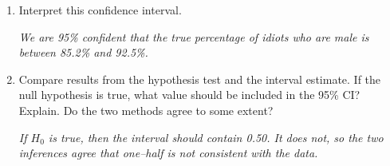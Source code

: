\begin{enumerate}
\begin{enumerate}
\begin{key} 
  $  (0.852, 0.925)$
\end{key}
     \item \label{longRun}Explain what the word ``confidence'' means for this
       confidence interval.
\begin{students}
    \vspace{3cm}    
\end{students}

\begin{key} 
  {\it Our confidence is in the process, not in just one interval. If
    we repeat the process (gather a new random sample) over and over,
    95\% of the intervals we create will include the true parameter of
  interest.}
\end{key}

  \end{enumerate}
\item Interpret this confidence interval.
\begin{students}
    \vspace{2cm}    
\end{students}

\begin{key} 
  {\it We are 95\% confident that the true percentage of idiots who
    are male is between 85.2\% and 92.5\%.}
\end{key}


\item Compare results from the hypothesis test and the interval
  estimate.  If the null hypothesis is true, what value should be
  included in the 95\% CI?  Explain. Do the two methods agree to some
  extent? 
\begin{students}
    \vspace{4.2cm}    
\end{students}

\begin{key} 
  {\it  If $H_0$ is true, then the interval should contain 0.50.  It
    does not, so the two inferences agree that one--half is not
    consistent with the data.} 
\end{key}
\end{enumerate}


